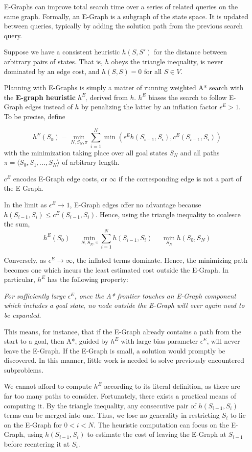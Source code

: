 \documentclass[letterpaper]{article}
\begin{document}
E-Graphs can improve total search time over a series of related queries on the same graph.
Formally, an E-Graph is a subgraph of the state space.
It is updated between queries, typically by adding the solution path from the previous search query.

Suppose we have a consistent heuristic $h(S,S')$ for the distance between arbitrary pairs of states.
That is, $h$ obeys the triangle inequality, is never dominated by an edge cost, and $h(S,S) = 0$ for all $S\in V$.

Planning with E-Graphs is simply a matter of running weighted A* search with the \textbf{E-graph heuristic} $h^E$, derived from $h$.
$h^E$ biases the search to follow E-Graph edges instead of $h$ by penalizing the latter by an inflation factor $\epsilon^E > 1$.
To be precise, define

\[h^E(S_0) = \min_{N,S_N,\pi} \sum_{i=1}^N \min \left(\epsilon^E h(S_{i-1},S_i),c^E(S_{i-1},S_i)\right)\]
with the minimization taking place over all goal states $S_N$ and all paths $\pi = \langle S_0,S_1,...,S_N \rangle$ of arbitrary length.

$c^E$ encodes E-Graph edge costs, or $\infty$ if the corresponding edge is not a part of the E-Graph.

In the limit as $\epsilon^E \rightarrow 1$, E-Graph edges offer no advantage because $h(S_{i-1},S_i) \le c^E(S_{i-1},S_i)$. Hence, using the triangle inequality to coalesce the sum,
\[h^E(S_0) = \min_{N,S_N,\pi} \sum_{i=1}^N h(S_{i-1},S_i) = \min_{S_N} h(S_0,S_N)\]

Conversely, as $\epsilon^E \rightarrow\infty$, the inflated terms dominate. Hence, the minimizing path becomes one which incurs the least estimated cost outside the E-Graph. In particular, $h^E$ has the following property:

\textit{For sufficiently large $\epsilon^E$, once the A* frontier touches an E-Graph component which includes a goal state, no node outside the E-Graph will ever again need to be expanded.}

This means, for instance, that if the E-Graph already contains a path from the start to a goal, then A*, guided by $h^E$ with large bias parameter $\epsilon^E$, will never leave the E-Graph.
If the E-Graph is small, a solution would promptly be discovered.
In this manner, little work is needed to solve previously encountered subproblems.

We cannot afford to compute $h^E$ according to its literal definition, as there are far too many paths to consider.
Fortunately, there exists a practical means of computing it. By the triangle inequality, any consecutive pair of $h(S_{i-1},S_i)$ terms can be merged into one.
Thus, we lose no generality in restricting $S_i$ to lie on the E-Graph for $0 < i < N$.
The heuristic computation can focus on the E-Graph, using $h(S_{i-1},S_i)$ to estimate the cost of leaving the E-Graph at $S_{i-1}$ before reentering it at $S_i$.
\end{document}

